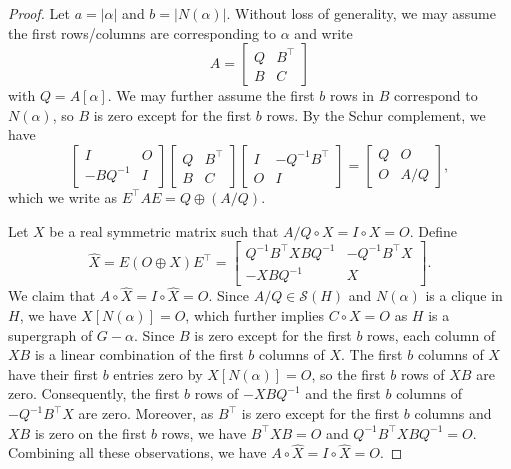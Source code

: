 \documentclass[10pt,a4paper]{amsart}
\newcommand{\mptn}{\mathcal{S}} %
\newcommand{\trans}{^\top}
\begin{document}
\begin{proof}
Let $a = |\alpha|$ and $b = |N(\alpha)|$.  Without loss of generality, we may assume the first rows/columns are corresponding to $\alpha$ and write 
\[
    A = 
        \begin{bmatrix}
        Q & B\trans \\
        B & C
    \end{bmatrix}
\]
with $Q = A[\alpha]$.  We may further assume the first $b$ rows in $B$ correspond to $N(\alpha)$, so $B$ is zero except for the first $b$ rows.  By the Schur complement, we have 
\[
    \begin{bmatrix}
        I & O \\
        -BQ^{-1} & I
    \end{bmatrix}
    \begin{bmatrix}
        Q & B\trans \\
        B & C
    \end{bmatrix}
    \begin{bmatrix}
        I & -Q^{-1}B\trans \\
        O & I
    \end{bmatrix} = 
    \begin{bmatrix}
    Q & O \\
    O & A / Q
    \end{bmatrix},
\]
which we write as $E\trans A E = Q\oplus (A/Q)$.

Let $X$ be a real symmetric matrix such that $A/Q\circ X = I\circ X = O$.  Define  
\[
    \widehat{X} = E(O\oplus X)E\trans = 
    \begin{bmatrix}
        Q^{-1}B\trans XBQ^{-1} & -Q^{-1}B\trans X\\
        -XBQ^{-1} & X
    \end{bmatrix}.
\]
We claim that $A\circ\widehat{X} = I\circ\widehat{X} = O$.  
Since $A/Q\in\mptn(H)$ and $N(\alpha)$ is a clique in $H$, we have $X[N(\alpha)] = O$, which further implies $C\circ X = O$ as $H$ is a supergraph of $G - \alpha$.  
Since $B$ is zero except for the first $b$ rows, each column of $XB$ is a linear combination of the first $b$ columns of $X$.  The first $b$ columns of $X$ have their first $b$ entries zero by $X[N(\alpha)] = O$, so the first $b$ rows of $XB$ are zero.  Consequently, the first $b$ rows of $-XBQ^{-1}$ and the first $b$ columns of $-Q^{-1}B\trans X$ are zero.  Moreover, as $B\trans$ is zero except for the first $b$ columns and $XB$ is zero on the first $b$ rows, we have $B\trans XB = O$ and $Q^{-1}B\trans XBQ^{-1} = O$.  Combining all these observations, we have $A\circ\widehat{X} = I\circ\widehat{X} = O$.  


\end{proof}
\end{document}
